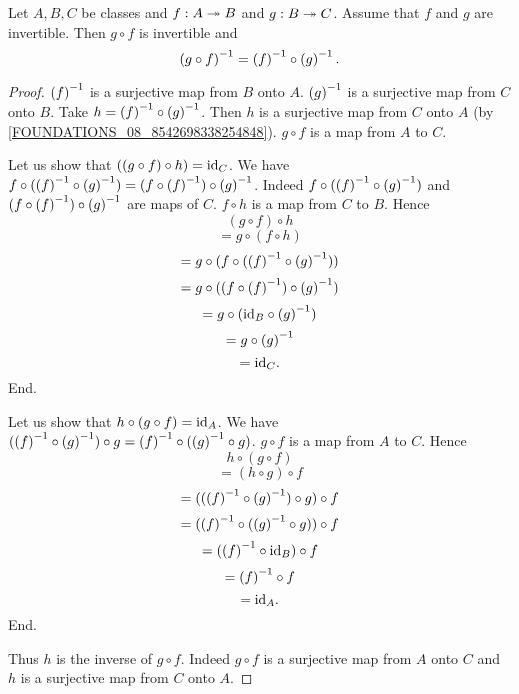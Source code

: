 \documentclass[../../set-theory/set-theory.tex]{subfiles}
\begin{document}
  \begin{forthel}
    \begin{proposition}
      Let $A, B, C$ be classes and $f : A \twoheadrightarrow B$ and $g : B \twoheadrightarrow C$.
      Assume that $f$ and $g$ are invertible.
      Then $g \circ f$ is invertible and
      \[ \left(g \circ f\right)^{-1} = \left(f\right)^{-1} \circ \left(g\right)^{-1}. \]
    \end{proposition}
    \begin{proof}
      $\left(f\right)^{-1}$ is a surjective map from $B$ onto $A$.
      $\left(g\right)^{-1}$ is a surjective map from $C$ onto $B$.
      Take $h = \left(f\right)^{-1} \circ \left(g\right)^{-1}$.
      Then $h$ is a surjective map from $C$ onto $A$
      (by \cref{FOUNDATIONS_08_8542698338254848}).
      $g \circ f$ is a map from $A$ to $C$.

      Let us show that $((g \circ f) \circ h) = \mathrm{id}_{C}$.
        We have $f \circ (\left(f\right)^{-1} \circ \left(g\right)^{-1}) = (f \circ \left(f\right)^{-1}) \circ \left(g\right)^{-1}$.
        Indeed $f \circ (\left(f\right)^{-1} \circ \left(g\right)^{-1})$ and
        $(f \circ \left(f\right)^{-1}) \circ \left(g\right)^{-1}$ are maps of $C$.
        $f \circ h$ is a map from $C$ to $B$.
        Hence
        \[  (g \circ f) \circ h                           \]
        \[    = g \circ (f \circ h)                       \]
        \[    = g \circ (f \circ (\left(f\right)^{-1} \circ \left(g\right)^{-1}))   \]
        \[    = g \circ ((f \circ \left(f\right)^{-1}) \circ \left(g\right)^{-1})   \]
        \[    = g \circ (\mathrm{id}_{B} \circ \left(g\right)^{-1})            \]
        \[    = g \circ \left(g\right)^{-1}                            \]
        \[    = \mathrm{id}_{C}.                                  \]
      End.

      Let us show that $h \circ (g \circ f) = \mathrm{id}_{A}$.
        We have $(\left(f\right)^{-1} \circ \left(g\right)^{-1}) \circ g = \left(f\right)^{-1} \circ (\left(g\right)^{-1} \circ g)$.
        $g \circ f$ is a map from $A$ to $C$.
        Hence
        \[  h \circ (g \circ f)                           \]
        \[    = (h \circ g) \circ f                       \]
        \[    = ((\left(f\right)^{-1} \circ \left(g\right)^{-1}) \circ g) \circ f   \]
        \[    = (\left(f\right)^{-1} \circ (\left(g\right)^{-1} \circ g)) \circ f   \]
        \[    = (\left(f\right)^{-1} \circ \mathrm{id}_{B}) \circ f            \]
        \[    = \left(f\right)^{-1} \circ f                            \]
        \[    = \mathrm{id}_{A}.                                  \]
      End.

      Thus $h$ is the inverse of $g \circ f$.
      Indeed $g \circ f$ is a surjective map from $A$ onto $C$ and $h$ is a
      surjective map from $C$ onto $A$.
    \end{proof}
  \end{forthel}
\end{document}
